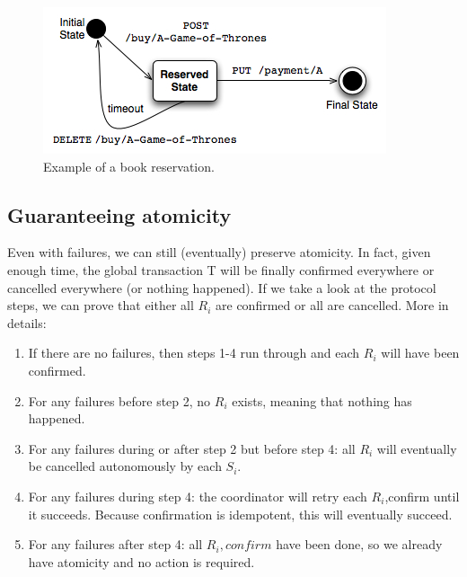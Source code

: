 \begin{figure} [ht]
\centering
\includegraphics[scale=0.75]{images/TCC_booksExample.jpg}
\caption{Example of a book reservation.}
\label{tcc-bookexample}
\end{figure}

\subsection{Guaranteeing atomicity}
\label{tcc-guaranteeing-atomicity}
Even with failures, we can still (eventually) preserve atomicity. In fact, given enough time, the global transaction T will be finally confirmed everywhere or cancelled everywhere (or nothing happened). If we take a look at the protocol steps, we can prove that either all $R_i$ are confirmed or all are cancelled. More in details:
\begin{enumerate}
\item If there are no failures, then steps 1-4 run through and each $R_i$ will have been confirmed.
\item For any failures before step 2, no $R_i$ exists, meaning that nothing has happened.
\item For any failures during or after step 2 but before step 4: all $R_i$ will eventually be cancelled autonomously by each $S_i$.
\item For any failures during step 4: the coordinator will retry each $R_i$,confirm until it succeeds. Because confirmation is idempotent, this will eventually succeed.
\item For any failures after step 4: all $R_i,confirm$ have been done, so we already have atomicity and no action is required.
\end{enumerate}
